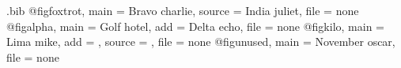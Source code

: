 \begin{filecontents*}{\jobname.bib}
@fig{foxtrot,
  main = {Bravo charlie},
  source = {India juliet},
  file = {none}
}
@fig{alpha,
  main = {Golf hotel},
  add = {Delta echo},
  file = {none}
}
@fig{kilo,
  main = {Lima mike},
  add = {},
  source = {},
  file = {none}
}
@fig{unused,
  main = {November oscar},
  file = {none}
}
\end{filecontents*}
\documentclass{article}
\usepackage[nopics]{figbib}

Kilo lima.
\fbList{\jobname}

